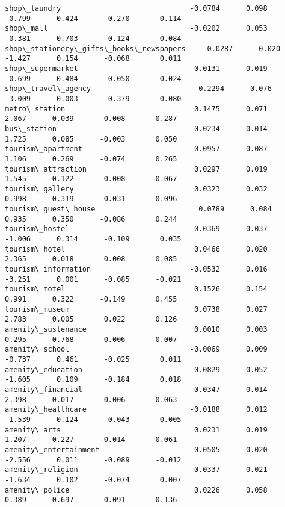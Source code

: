 \documentclass[11pt]{article}
\begin{document}
\begin{Verbatim}[commandchars=\\\{\}]
shop\_laundry                              -0.0784      0.098     -0.799      0.424      -0.270       0.114
shop\_mall                                 -0.0202      0.053     -0.381      0.703      -0.124       0.084
shop\_stationery\_gifts\_books\_newspapers    -0.0287      0.020     -1.427      0.154      -0.068       0.011
shop\_supermarket                          -0.0131      0.019     -0.699      0.484      -0.050       0.024
shop\_travel\_agency                        -0.2294      0.076     -3.009      0.003      -0.379      -0.080
metro\_station                              0.1475      0.071      2.067      0.039       0.008       0.287
bus\_station                                0.0234      0.014      1.725      0.085      -0.003       0.050
tourism\_apartment                          0.0957      0.087      1.106      0.269      -0.074       0.265
tourism\_attraction                         0.0297      0.019      1.545      0.122      -0.008       0.067
tourism\_gallery                            0.0323      0.032      0.998      0.319      -0.031       0.096
tourism\_guest\_house                        0.0789      0.084      0.935      0.350      -0.086       0.244
tourism\_hostel                            -0.0369      0.037     -1.006      0.314      -0.109       0.035
tourism\_hotel                              0.0466      0.020      2.365      0.018       0.008       0.085
tourism\_information                       -0.0532      0.016     -3.251      0.001      -0.085      -0.021
tourism\_motel                              0.1526      0.154      0.991      0.322      -0.149       0.455
tourism\_museum                             0.0738      0.027      2.783      0.005       0.022       0.126
amenity\_sustenance                         0.0010      0.003      0.295      0.768      -0.006       0.007
amenity\_school                            -0.0069      0.009     -0.737      0.461      -0.025       0.011
amenity\_education                         -0.0829      0.052     -1.605      0.109      -0.184       0.018
amenity\_financial                          0.0347      0.014      2.398      0.017       0.006       0.063
amenity\_healthcare                        -0.0188      0.012     -1.539      0.124      -0.043       0.005
amenity\_arts                               0.0231      0.019      1.207      0.227      -0.014       0.061
amenity\_entertainment                     -0.0505      0.020     -2.556      0.011      -0.089      -0.012
amenity\_religion                          -0.0337      0.021     -1.634      0.102      -0.074       0.007
amenity\_police                             0.0226      0.058      0.389      0.697      -0.091       0.136

\end{Verbatim}
\end{document}
